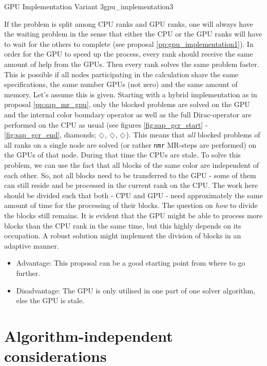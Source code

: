 \documentclass{article}
\DeclareRobustCommand{\diamond}{%
  \mathbin{\text{\scalebox{.75}{\rotatebox[origin=c]{45}{$\Box$}}}}%
}
\theoremstyle{plain} %
\theoremstyle{convention} %
\theoremstyle{remark} %
\def\code#1{\texttt{#1}}
\numberwithin{equation}{section}
\begin{document}
\begin{proposal}{GPU Implementation Variant 3}{gpu_implementation3} %

If the problem is split among CPU ranks and GPU ranks, one will always have the waiting problem in the sense that either the CPU or the GPU ranks will have to wait for the others to complete (see proposal \ref{pp:gpu_implementation1}). In order for the GPU to speed up the process, every rank should receive the same amount of help from the GPUs. Then every rank solves the same problem faster. This is possible if all nodes participating in the calculation share the same specifications, the same number GPUs (not zero) and the same amount of memory. Let's assume this is given. Starting with a hybrid implementation as in proposal \ref{pp:sap_mr_gpu}, only the blocked problems are solved on the GPU and the internal color boundary operator as well as the full Dirac-operator are performed on the CPU as usual (see figures \ref{fig:sap_gcr_start} - \ref{fig:sap_gcr_end}, diamonds; \textcolor{cbrown}{$\diamond$}, \textcolor{cred}{$\diamond$}, \textcolor{cblue}{$\diamond$}). This means that \textit{all} blocked problems of all ranks on a single node are solved (or rather \code{nmr} MR-steps are performed) on the GPUs of that node. During that time the CPUs are stale. To solve this problem, we can use the fact that all blocks of the same color are independent of each other. So, not all blocks need to be transferred to the GPU - some of them can still reside and be processed in the current rank on the CPU. The work here should be divided such that both - CPU and GPU - need approximately the same amount of time for the processing of their blocks. The question on \textit{how} to divide the blocks still remains. It is evident that the GPU might be able to process more blocks than the CPU rank in the same time, but this highly depends on its occupation. A robust solution might implement the division of blocks in an adaptive manner.

\begin{itemize}
    \item Advantage: This proposal can be a good starting point from where to go further.
    \item Disadvantage: The GPU is only utilised in one part of one solver algorithm, else the GPU is stale.
\end{itemize}


\end{proposal}

\section{Algorithm-independent considerations}
\end{document}
